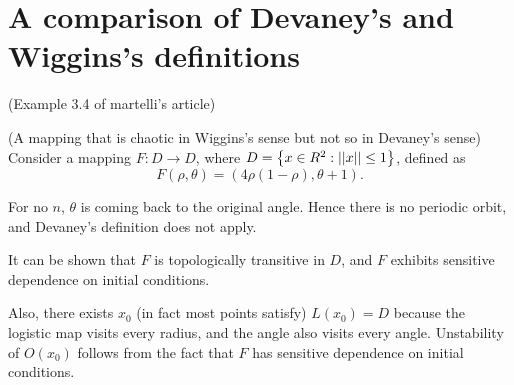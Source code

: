 \documentclass[11pt]{book}
\begin{document}
\section{A comparison of Devaney's and Wiggins's definitions}
(Example 3.4 of martelli's article)
\begin{proposition}
  (A mapping that is chaotic in Wiggins's sense but not so in Devaney's sense)
  Consider a mapping $F: D \to D$, where $D = \left \{ x \in R^2: \left|\left| x \right|\right| \leq 1 \right \}$, defined as
  \begin{equation*}
    F(\rho, \theta) = (4\rho(1 - \rho), \theta + 1).
  \end{equation*}
\end{proposition}
For no $n$, $\theta$ is coming back to the original angle. 
Hence there is no periodic orbit, and Devaney's definition does not apply.

It can be shown that $F$ is topologically transitive in $D$, and $F$ exhibits sensitive dependence on initial conditions.

Also, there exists $x_0$ (in fact most points satisfy) $L(x_0) = D$
because the logistic map visits every radius, and the angle also visits every angle.
Unstability of $O(x_0)$ follows from the fact that $F$ has sensitive dependence on initial conditions.
 


\end{document}
